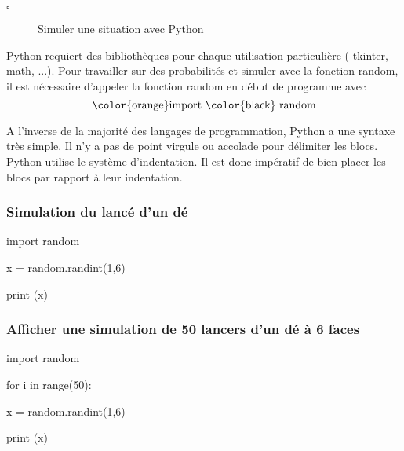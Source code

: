 \begin{titre}[Probabilités]

\end{titre}


\begin{CpsCol}
\begin{description}
\item[$\square$] Simuler une situation avec Python
\end{description}
\end{CpsCol}



Python requiert des bibliothèques pour chaque utilisation particulière ( tkinter, math, ...). Pour travailler sur des probabilités et simuler avec la fonction random, il est nécessaire d'appeler la fonction random en début de programme avec  $$ \text{\color{orange}import \color{black} random}$$

A l'inverse de la majorité des langages de programmation, Python a une syntaxe très simple. Il n'y a pas de point virgule ou accolade pour délimiter les blocs. Python utilise le système d'indentation. Il est donc impératif de bien placer les blocs par rapport à leur indentation.


\subsubsection*{Simulation du lancé d'un dé}

\color{orange} import \color{black} random

x = random.randint(1,6)

\color{purple} print \color{black}(x)



\subsubsection*{Afficher une simulation de 50 lancers d'un dé à 6 faces}


\color{orange} import \color{black} random

\color{orange} for \color{black} i \color{orange} in \color{purple}range\color{black}(50):

\hspace{0.4cm}     x = random.randint(1,6)
 
\hspace{0.4cm}   \color{purple} print \color{black}(x)



